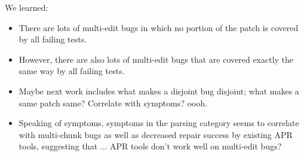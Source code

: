 We learned:
\begin{itemize}
	\item There are lots of multi-edit bugs in which no portion of the patch is covered by all failing 
	tests.
	\item However, there are also lots of multi-edit bugs that are covered exactly the same way by all 
	failing tests.
	\item Maybe next work includes what makes a disjoint bug disjoint; what makes a same patch 
	same? Correlate with symptoms? oooh.
	\item Speaking of symptoms, symptoms in the parsing category seems to correlate with 
	multi-chunk bugs as well as decreased repair success by existing APR tools, suggesting that ... 
	APR tools don't work well on multi-edit bugs?
\end{itemize}